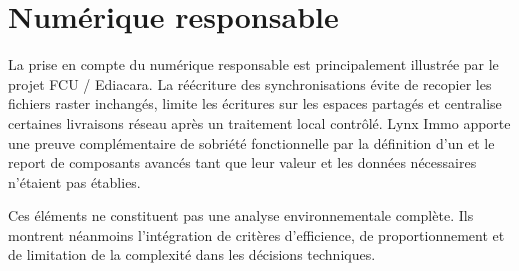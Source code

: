 \section{Numérique responsable}

La prise en compte du numérique responsable est principalement illustrée par le projet FCU / Ediacara. La réécriture des synchronisations évite de recopier les fichiers raster inchangés, limite les écritures sur les espaces partagés et centralise certaines livraisons réseau après un traitement local contrôlé. Lynx Immo apporte une preuve complémentaire de sobriété fonctionnelle par la définition d'un  et le report de composants avancés tant que leur valeur et les données nécessaires n'étaient pas établies.

Ces éléments ne constituent pas une analyse environnementale complète. Ils montrent néanmoins l'intégration de critères d'efficience, de proportionnement et de limitation de la complexité dans les décisions techniques.
